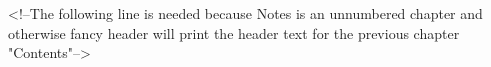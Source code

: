 <!--The following line is needed because Notes is an unnumbered chapter and otherwise fancy header will print the header text for the previous chapter "Contents"-->

\printendnotes[itemize]
